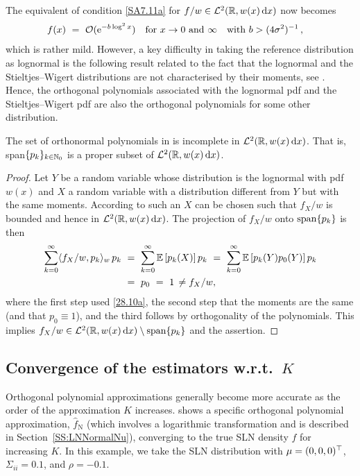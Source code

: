 The equivalent of condition \eqref{SA7.11a} for $f/w\in\mathcal{L}^2(\mathbb{R}, w(x) \mathop{}\!\mathrm{d} x)$ now becomes
\begin{align}\label{SA7.11c}
f(x)\ &=\ {\mathcal{O}}(\mathrm{e}^{ -b \log^2x } )\quad\text{for }x\to 0 \text{ and } \infty \quad\text{with } b> (4\sigma^2)^{-1}\,,
\end{align}
which is rather mild. However,
a key difficulty in taking the reference distribution as lognormal is the following
result related to the fact that the lognormal and the Stieltjes--Wigert distributions are not characterised by their moments, see \cite{Heyde63,Berg1984,Ch79,Ch03}. Hence, the orthogonal polynomials associated with the lognormal pdf and the Stieltjes--Wigert pdf are also the orthogonal polynomials for some other distribution.
\begin{proposition} \label{prop:ln_incomplete} The set of orthonormal polynomials in
 is incomplete
in $\mathcal{L}^2(\mathbb{R}, w(x) \mathop{}\!\mathrm{d} x)$. That is, {\rm span}$\{p_k\}_{k \in \mathbb{N}_0}$ is a proper subset of $\mathcal{L}^2(\mathbb{R}, w(x) \mathop{}\!\mathrm{d} x)$.
\end{proposition}
\begin{proof} Let $Y$ be a random variable whose distribution is the lognormal with pdf $w(x)$
and $X$ a random variable with a distribution different from $Y$
but with the same moments. According to \cite[pp.\ 201--202]{Berg1984} such an $X$ can be
chosen such that $f_X/w$ is bounded and hence in $\mathcal{L}^2(\mathbb{R}, w(x) \mathop{}\!\mathrm{d} x)$. The projection of
$f_X/w$  onto ${\rm span}\{p_k\}$ is then
\begin{align*}\sum_{k=0}^\infty \langle f_X/w, p_k \rangle_w \, p_k\ &=\
\sum_{k=0}^\infty \operatorname{{\mathbb E}}\left[p_k(X)\right]p_k\ =\ \sum_{k=0}^\infty \operatorname{{\mathbb E}}\left[p_k(Y) p_0(Y) \right]p_k\\
&=\ p_0\ =\ 1\,\neq f_X/w,
\end{align*}
where the first step used \eqref{28.10a}, the second step that the moments are the same (and that $p_0 \equiv 1$), and the third follows by orthogonality of the polynomials.
This implies $f_X/w\in\mathcal{L}^2(\mathbb{R}, w(x) \mathop{}\!\mathrm{d} x)\setminus{\rm span}\{p_k\}$ and the assertion.
\end{proof}

\subsection{Convergence of the estimators  w.r.t.\ $K$ }

Orthogonal polynomial approximations generally become more accurate as the order of the approximation $K$ increases.  shows a specific orthogonal polynomial approximation, $\widehat{f}_{\mathrm{N}}$ (which involves a logarithmic transformation and is described in Section~\ref{SS:LNNormalNu}), converging to the true SLN density $f$ for increasing $K$. In this example, we take the SLN distribution with $\mu=(0,0,0)^\top$, $\Sigma_{ii} = 0.1$, and $\rho = -0.1$.

